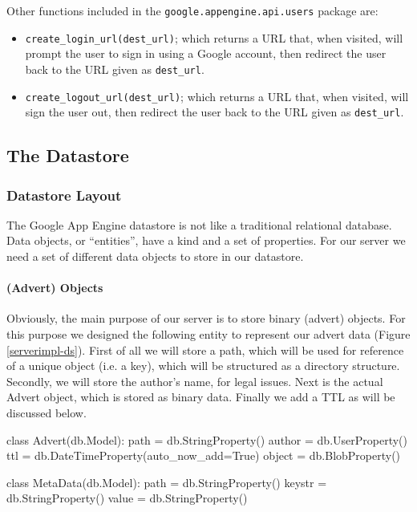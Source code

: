 Other functions included in the \texttt{google.appengine.api.users} package are:

\begin{itemize} 
\item \texttt{create\_login\_url(dest\_url)}; which returns a URL that, when
visited, will prompt the user to sign in using a Google account, then redirect
the user back to the URL given as \texttt{dest\_url}.
\item \texttt{create\_logout\_url(dest\_url)}; which returns a URL that, when
visited, will sign the user out, then redirect the user back to the URL given as
\texttt{dest\_url}.
\end{itemize}

\subsection{The Datastore}
\subsubsection{Datastore Layout}
The Google App Engine datastore is not like a traditional relational database.
Data objects, or ``entities'', have a kind and a set of properties. For our
server we need a set of different data objects to store in our datastore.

\paragraph{(Advert) Objects}
Obviously, the main purpose of our server is to store binary (advert) objects.
For this purpose we designed the following entity to represent our advert data
(Figure \ref{serverimpl-ds}). First of all we will store a path, which will be
used for reference of a unique object (i.e. a key), which will be structured as a
directory structure. Secondly, we will store the author's name, for legal issues.
Next is the actual Advert object, which is stored as binary data. Finally we add
a TTL as will be discussed below.

\begin{figure*}[ht] %
\begin{center}
\begin{code}
class Advert(db.Model):
  path   = db.StringProperty()
  author = db.UserProperty()
  ttl    = db.DateTimeProperty(auto_now_add=True)
  object = db.BlobProperty()
  
class MetaData(db.Model):
  path   = db.StringProperty()
  keystr = db.StringProperty()
  value  = db.StringProperty()
\end{code}
\caption{An Advert Object.\label{serverimpl-ds}}
\end{center}
\end{figure*}


